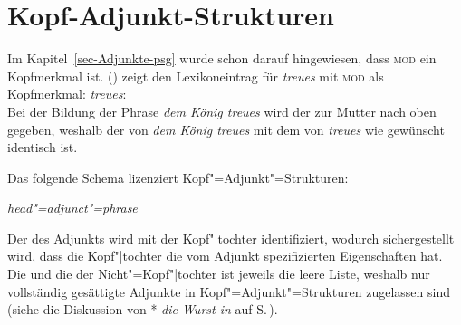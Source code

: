 \section{Kopf-Adjunkt-Strukturen}

Im Kapitel~\ref{sec-Adjunkte-psg} wurde schon darauf hingewiesen, dass \textsc{mod} ein Kopfmerkmal
ist. () zeigt den Lexikoneintrag für \emph{treues} mit \textsc{mod} als Kopfmerkmal:
\ea
\label{le-treue-head-mod}
\emph{treues}:\\
\z
Bei der Bildung der Phrase \emph{dem König treues} wird der \headw zur Mutter nach oben gegeben,
weshalb der \modw von \emph{dem König treues} mit dem von \emph{treues} wie gewünscht identisch ist.

Das folgende Schema lizenziert Kopf"=Adjunkt"=Strukturen:
\begin{samepage}
\begin{schema}
\label{ha-schema-prel}
\textit{head"=adjunct"=phrase} \impl\\
\end{schema}
\end{samepage}
Der \modw des Adjunkts  wird mit der Kopf"|tochter identifiziert, wodurch
sichergestellt wird, dass die Kopf"|tochter die vom Adjunkt spezifizierten Eigenschaften hat. Die
\sprl und die \compsl der Nicht"=Kopf"|tochter ist jeweils die leere Liste, weshalb nur vollständig gesättigte Adjunkte 
in Kopf"=Adjunkt"=Strukturen zugelassen sind (siehe die Diskussion von * \emph{die Wurst in} auf S.\,\pageref{ex-die-Wurst-in}).

